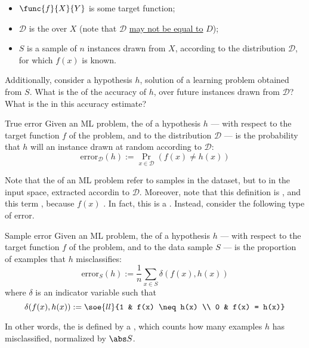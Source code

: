 \documentclass[a4paper, 12pt]{report}
\begin{document}
    \begin{itemize}
        \item $\func{f}{X}{Y}$ is some target function;
        \item $\mathcal D$ is the  over $X$ (note that $\mathcal D$ \underline{may not be equal to} $D$);
        \item $S$ is a sample of $n$ instances drawn from $X$, according to the distribution $\mathcal D$, for which $f(x)$ is known.
    \end{itemize}

    Additionally, consider a hypothesis $h$, solution of a learning problem obtained from $S$. What is the  of the accuracy of $h$, over future instances drawn from $\mathcal D$? What is the  in this accuracy estimate?

    \begin{frameddefn}{True error}
        Given an ML problem, the  of a hypothesis $h$ --- with respect to the target function $f$ of the problem, and to the distribution $\mathcal D$ --- is the probability that $h$ will  an instance drawn at random according to $\mathcal D$: $$\mathrm{error}_\mathcal D (h) := \Pr_{x \in \mathcal D}{(f(x) \neq h(x))}$$
    \end{frameddefn}

    Note that the  of an ML problem  refer to samples in the dataset, but to  in the input space, extracted accordin to $\mathcal D$. Moreover, note that this definition is , and this term , because $f(x)$ . In fact, this is a . Instead, consider the following type of error.

    \begin{frameddefn}{Sample error}
        Given an ML problem, the  of a hypothesis $h$ --- with respect to the target function $f$ of the problem, and to the data sample $S$ --- is the proportion of examples that $h$ misclassifies: $$\mathrm{error}_S(h) := \dfrac{1}{n} \sum_{x \in S}{\delta(f(x), h(x))}$$ where $\delta$ is an indicator variable such that $$\delta(f(x), h(x)) := \soe{ll}{1 & f(x) \neq h(x) \\ 0 & f(x) = h(x)}$$
    \end{frameddefn}

    In other words, the  is defined by a , which counts how many examples $h$ has misclassified, normalized by $\abs S$.
\end{document}
